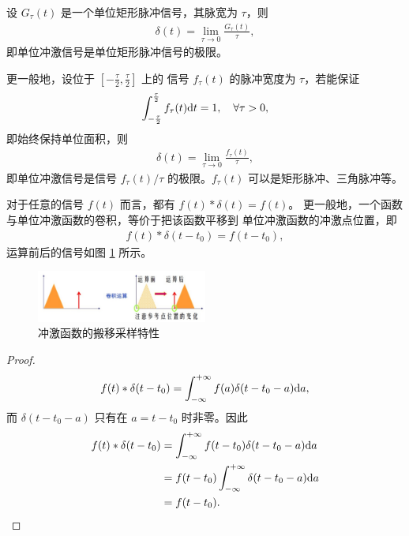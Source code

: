 \begin{definition}[单位冲激信号的极限定义式]
    设 $G_{\tau}(t)$ 是一个单位矩形脉冲信号，其脉宽为 $\tau$，则
    \begin{align*}
        \delta(t) = \lim_{\tau \to 0}\frac{G_{\tau}(t)}{\tau},
    \end{align*}
    即单位冲激信号是单位矩形脉冲信号的极限。
\end{definition}

\begin{remark}
    更一般地，设位于 $[-\frac{\tau}{2}, \frac{\tau}{2}]$ 上的
    信号 $f_{\tau}(t)$ 的脉冲宽度为 $\tau$，若能保证
    \begin{align*}
        \int_{-\frac{\tau}{2}}^{\frac{\tau}{2}}f_{\tau}(t)\mathrm{d}t = 1, \quad \forall \tau > 0,
    \end{align*}
    即始终保持单位面积，则
    \begin{align*}
        \delta(t) = \lim_{\tau \to 0}\frac{f_{\tau}(t)}{\tau},
    \end{align*}
    即单位冲激信号是信号 $f_{\tau}(t)/\tau$ 的极限。$f_{\tau}(t)$ 可以是矩形脉冲、三角脉冲等。
\end{remark}

\begin{property}[冲激函数的搬移采样特性]
    对于任意的信号 $f(t)$ 而言，都有 $f(t) * \delta(t) = f(t)$。
    更一般地，一个函数与单位冲激函数的卷积，等价于把该函数平移到
    单位冲激函数的冲激点位置，即
    \begin{align*}
        f(t) * \delta(t - t_0) = f(t - t_0),
    \end{align*}
    运算前后的信号如图 \ref{fig:impulse-signal-convolution-translation} 所示。
    \begin{figure}[H]
        \centering
        \includegraphics[width=0.5\textwidth]{chap1/img/impulse-signal-convolution-translation.png}
        \caption{冲激函数的搬移采样特性}
        \label{fig:impulse-signal-convolution-translation}
    \end{figure}
\end{property}

\begin{proof}
    \begin{align*}
        f(t) * \delta(t - t_0) = \int_{-\infty}^{+\infty}f(a)\delta(t - t_0 - a)\mathrm{d}a,
    \end{align*}
    而 $\delta(t - t_0 - a)$ 只有在 $a = t - t_0$ 时非零。因此
    \begin{align*}
        f(t) * \delta(t - t_0) & = \int_{-\infty}^{+\infty}f(t - t_0)\delta(t - t_0 - a)\mathrm{d}a \\
        & = f(t - t_0)\int_{-\infty}^{+\infty}\delta(t - t_0 - a)\mathrm{d}a \\
        & = f(t - t_0).
    \end{align*}
\end{proof}

